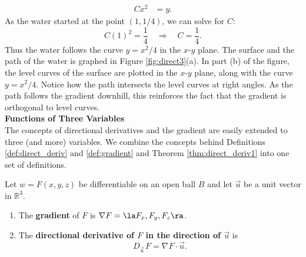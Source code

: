 {\begin{align*}
Cx^2 &= y.
\end{align*}
As the water started at the point $(1,1/4)$, we can solve for $C$:
\[
C(1)^2 = \frac14 \quad \Rightarrow \quad C = \frac14.
\]
Thus the water follows the curve $y=x^2/4$ in the $x$-$y$ plane. The surface and the path of the water is graphed in Figure \ref{fig:direct3}(a). In part (b) of the figure, the level curves of the surface are plotted in the $x$-$y$ plane, along with the curve $y=x^2/4$. Notice how the path intersects the level curves at right angles. As the path follows the gradient downhill, this reinforces the fact that the gradient is orthogonal to level curves.
}\\

\noindent\textbf{\large Functions of Three Variables}\\

The concepts of directional derivatives and the gradient are easily extended to three (and more) variables. We combine the concepts behind Definitions \ref{def:direct_deriv} and \ref{def:gradient} and Theorem \ref{thm:direct_deriv1} into one set of definitions.

{Let $w=F(x,y,z)$ be differentiable on an open ball $B$ and let $\vec u $ be a unit vector in $\mathbb{R}^3$.
\begin{enumerate}
	\item	The \textbf{gradient} of $F$ is $\nabla F = \la F_x,F_y,F_z\ra$.
	\item The \textbf{directional derivative of $F$ in the direction of $\vec u$} is 
	\[
	D_{\vec u\,}F=\nabla F\cdot \vec u.
	\]
\end{enumerate}
}

